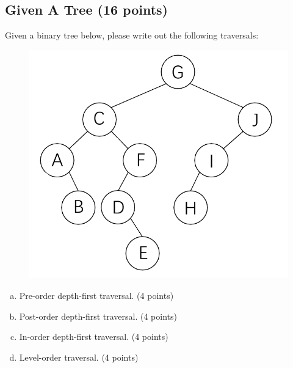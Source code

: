 \documentclass[11pt]{exam}
\begin{document}
\subsection{Given A Tree (16 points)}
Given a binary tree below, please write out the following traversals:
\begin{figure}[H]
\centering
\includegraphics[width=.5\linewidth]{binary_tree.png}
\end{figure}
\begin{enumerate}[(a)]
\item Pre-order depth-first traversal. (4 points)
\begin{solution}
\end{solution}

\item Post-order depth-first traversal. (4 points)
\begin{solution}
\end{solution}

\item In-order depth-first traversal. (4 points)
\begin{solution}
\end{solution}

\item Level-order traversal. (4 points)
\begin{solution}
\end{solution}

\end{enumerate}
\end{document}

